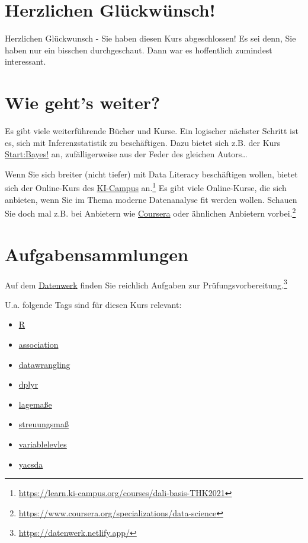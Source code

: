 \documentclass[
  a4paper,
]{scrbook}
\providecommand{\tightlist}{%
  \setlength{\itemsep}{0pt}\setlength{\parskip}{0pt}}\usepackage{longtable,booktabs,array}
\theoremstyle{definition}
\theoremstyle{definition}
\theoremstyle{definition}
\theoremstyle{remark}
\begin{document}
\section{Herzlichen Glückwünsch!}\label{herzlichen-gluxfcckwuxfcnsch}


Herzlichen Glückwunsch - Sie haben diesen Kurs abgeschlossen! Es sei
denn, Sie haben nur ein bisschen durchgeschaut. Dann war es hoffentlich
zumindest interessant.

\section{Wie geht's weiter?}\label{wie-gehts-weiter}

Es gibt viele weiterführende Bücher und Kurse. Ein logischer nächster
Schritt ist es, sich mit Inferenzstatistik zu beschäftigen. Dazu bietet
sich z.B. der Kurs \href{https://start-bayes.netlify.app/}{Start:Bayes!}
an, zufälligerweise aus der Feder des gleichen Autors\ldots{}

Wenn Sie sich breiter (nicht tiefer) mit Data Literacy beschäftigen
wollen, bietet sich der Online-Kurs des
\href{https://learn.ki-campus.org/courses/dali-basis-THK2021}{KI-Campus}
an.\footnote{\url{https://learn.ki-campus.org/courses/dali-basis-THK2021}}
Es gibt viele Online-Kurse, die sich anbieten, wenn Sie im Thema moderne
Datenanalyse fit werden wollen. Schauen Sie doch mal z.B. bei Anbietern
wie
\href{https://www.coursera.org/specializations/data-science}{Coursera}
oder ähnlichen Anbietern vorbei.\footnote{\url{https://www.coursera.org/specializations/data-science}}

\section{Aufgabensammlungen}\label{aufgabensammlungen}

Auf dem \href{https://datenwerk.netlify.app/}{Datenwerk} finden Sie
reichlich Aufgaben zur Prüfungsvorbereitung.\footnote{\url{https://datenwerk.netlify.app/}}

U.a. folgende Tags sind für diesen Kurs relevant:

\begin{itemize}
\tightlist
\item
  \href{https://datenwerk.netlify.app/\#category=R}{R}
\item
  \href{https://datenwerk.netlify.app/\#category=association}{association}
\item
  \href{https://datenwerk.netlify.app/\#category=datawrangling}{datawrangling}
\item
  \href{https://datenwerk.netlify.app/\#category=dplyr}{dplyr}
\item
  \href{https://datenwerk.netlify.app/\#category=lagema\%C3\%9Fe}{lagemaße}
\item
  \href{https://datenwerk.netlify.app/\#category=streuungsma\%C3\%9F}{streuungsmaß}
\item
  \href{https://datenwerk.netlify.app/\#category=variable-levels}{variablelevles}
\item
  \href{https://datenwerk.netlify.app/\#category=yacsda}{yacsda}
\end{itemize}
\end{document}
